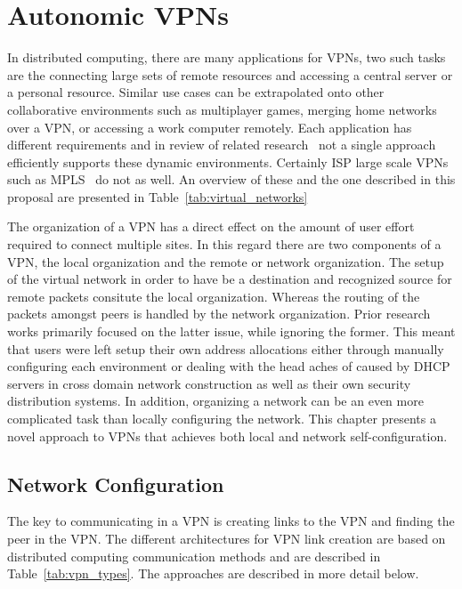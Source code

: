\chapter{Autonomic VPNs}
\label{vpns}
In distributed computing, there are many applications for VPNs, two such tasks
are the connecting large sets of remote resources and accessing a central
server or a personal resource.  Similar use cases can be extrapolated onto
other collaborative environments such as multiplayer games, merging home
networks over a VPN, or accessing a work computer remotely.  Each application
has different requirements and in review of related research~\cite{ipop, vine,
violin, vnet, ocala, softudc, openvpn, hamachi, wippien, gbridge, pvc, tinc,
n2n, p2pvpn, l2tp} not a single approach efficiently supports these dynamic
environments.  Certainly ISP large scale VPNs such as MPLS~\cite{mpls} do not
as well.  An overview of these and the one described in this proposal are
presented in Table~\ref{tab:virtual_networks}

The organization of a VPN has a direct effect on the amount of user effort
required to connect multiple sites.  In this regard there are two components of
a VPN, the local organization and the remote or network organization.  The setup
of the virtual network in order to have be a destination and recognized source
for remote packets consitute the local organization.  Whereas the routing of
the packets amongst peers is handled by the network organization.  Prior
research works primarily focused on the latter issue, while ignoring the former.
This meant that users were left setup their own address allocations either
through manually configuring each environment or dealing with the head aches of
caused by DHCP servers in cross domain network construction as well as their
own security distribution systems.  In addition, organizing a network can be an
even more complicated task than locally configuring the network.  This chapter
presents a novel approach to VPNs that achieves both local and network
self-configuration.

\section{Network Configuration}
The key to communicating in a VPN is creating links to the VPN and finding
the peer in the VPN.  The different architectures for VPN link creation are
based on distributed computing communication methods and are described in
Table~\ref{tab:vpn_types}.  The approaches are described in more detail
below.

